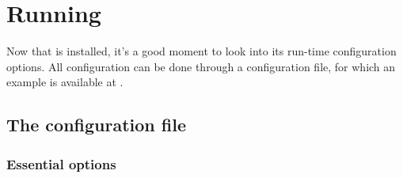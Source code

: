 \chapter{Running }

Now that  is installed, it's a good moment to look into its
run-time configuration options.  All configuration can be done through a
configuration file, for which an example is available at
.

\section{The configuration file}

\subsection{Essential options}

